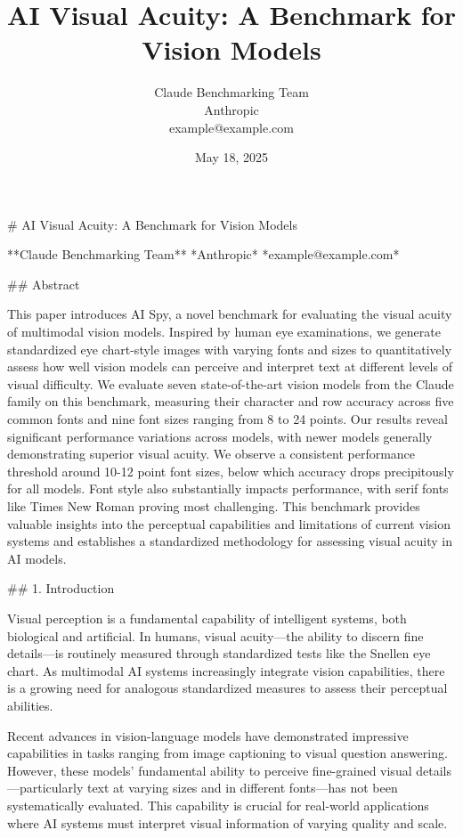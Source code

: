 \documentclass{article}
\title{AI Visual Acuity: A Benchmark for Vision Models}
\author{Claude Benchmarking Team\\Anthropic\\example@example.com}
\date{May 18, 2025}
\begin{document}
\maketitle

# AI Visual Acuity: A Benchmark for Vision Models

**Claude Benchmarking Team**  
*Anthropic*  
*example@example.com*

## Abstract

This paper introduces AI Spy, a novel benchmark for evaluating the visual acuity of multimodal vision models. Inspired by human eye examinations, we generate standardized eye chart-style images with varying fonts and sizes to quantitatively assess how well vision models can perceive and interpret text at different levels of visual difficulty. We evaluate seven state-of-the-art vision models from the Claude family on this benchmark, measuring their character and row accuracy across five common fonts and nine font sizes ranging from 8 to 24 points. Our results reveal significant performance variations across models, with newer models generally demonstrating superior visual acuity. We observe a consistent performance threshold around 10-12 point font sizes, below which accuracy drops precipitously for all models. Font style also substantially impacts performance, with serif fonts like Times New Roman proving most challenging. This benchmark provides valuable insights into the perceptual capabilities and limitations of current vision systems and establishes a standardized methodology for assessing visual acuity in AI models.

## 1. Introduction

Visual perception is a fundamental capability of intelligent systems, both biological and artificial. In humans, visual acuity—the ability to discern fine details—is routinely measured through standardized tests like the Snellen eye chart. As multimodal AI systems increasingly integrate vision capabilities, there is a growing need for analogous standardized measures to assess their perceptual abilities.

Recent advances in vision-language models have demonstrated impressive capabilities in tasks ranging from image captioning to visual question answering. However, these models' fundamental ability to perceive fine-grained visual details—particularly text at varying sizes and in different fonts—has not been systematically evaluated. This capability is crucial for real-world applications where AI systems must interpret visual information of varying quality and scale.
\end{document}
